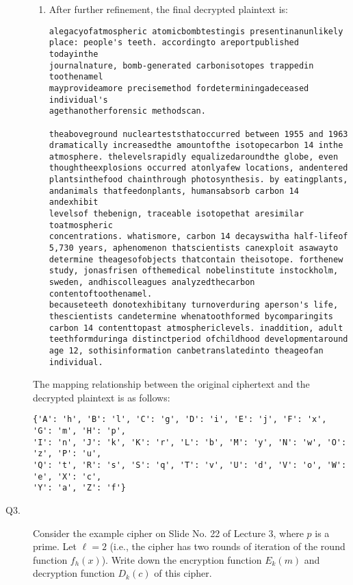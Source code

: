 \documentclass[11pt,epsfig]{article}
\begin{document}
\begin{description}
\begin{enumerate}
\item After further refinement, the final decrypted plaintext is:

\begin{verbatim}
alegacyofatmospheric atomicbombtestingis presentinanunlikely
place: people's teeth. accordingto areportpublished todayinthe
journalnature, bomb-generated carbonisotopes trappedin toothenamel
mayprovideamore precisemethod fordeterminingadeceased individual's
agethanotherforensic methodscan.

theaboveground nuclearteststhatoccurred between 1955 and 1963
dramatically increasedthe amountofthe isotopecarbon 14 inthe
atmosphere. thelevelsrapidly equalizedaroundthe globe, even
thoughtheexplosions occurred atonlyafew locations, andentered
plantsinthefood chainthrough photosynthesis. by eatingplants,
andanimals thatfeedonplants, humansabsorb carbon 14 andexhibit
levelsof thebenign, traceable isotopethat aresimilar toatmospheric
concentrations. whatismore, carbon 14 decayswitha half-lifeof
5,730 years, aphenomenon thatscientists canexploit asawayto
determine theagesofobjects thatcontain theisotope. forthenew
study, jonasfrisen ofthemedical nobelinstitute instockholm,
sweden, andhiscolleagues analyzedthecarbon contentoftoothenamel.
becauseteeth donotexhibitany turnoverduring aperson's life,
thescientists candetermine whenatoothformed bycomparingits
carbon 14 contenttopast atmosphericlevels. inaddition, adult
teethformduringa distinctperiod ofchildhood developmentaround
age 12, sothisinformation canbetranslatedinto theageofan
individual.
\end{verbatim}
\end{enumerate}
The mapping relationship between the original ciphertext and the decrypted plaintext is as follows:

\begin{verbatim}
{'A': 'h', 'B': 'l', 'C': 'g', 'D': 'i', 'E': 'j', 'F': 'x', 'G': 'm', 'H': 'p',
'I': 'n', 'J': 'k', 'K': 'r', 'L': 'b', 'M': 'y', 'N': 'w', 'O': 'z', 'P': 'u',
'Q': 't', 'R': 's', 'S': 'q', 'T': 'v', 'U': 'd', 'V': 'o', 'W': 'e', 'X': 'c',
'Y': 'a', 'Z': 'f'}
\end{verbatim}


\item[Q3.]
Consider the example cipher on Slide No. 22 of Lecture 3, where $p$ is a prime.  Let 
$\ell =2$ (i.e., the cipher has two rounds of iteration of the 
round function $f_h(x)$).  Write down the encryption function $E_k(m)$ and decryption function $D_k(c)$ of this cipher.     \hfill {} 


\end{description}
\end{document}
